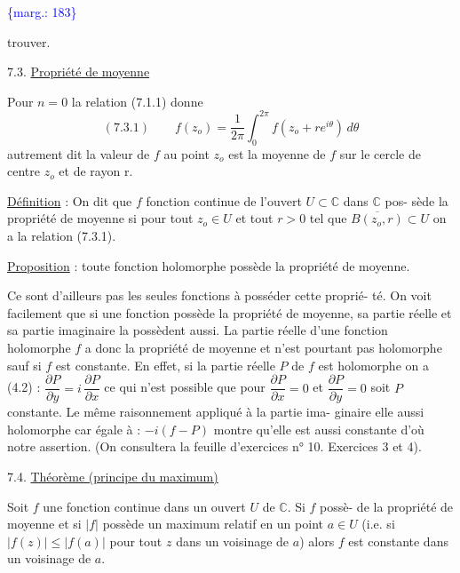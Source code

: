 \documentclass[11pt]{article}
\newcommand{\scanpage}[1]{\par\bigskip\noindent{\small\sffamily[scan #1]}\par}
\newcommand{\mspage}[1]{{\small\sffamily[p.\,#1]}}
\newcommand{\margin}[1]{\textcolor{blue}{\{\textsf{marg.:} #1\}}}
\newcommand{\uline}[1]{\underline{#1}}
\begin{document}
\margin{183}

\clearpage
\scanpage{119/184}
\mspage{- 3 -}

trouver.

7.3. \uline{Propriété de moyenne}

Pour $n = 0$ la relation (7.1.1) donne
\[ (7.3.1) \qquad f(z_o) = \frac{1}{2\pi}\int_0^{2\pi} f(z_o + re^{i\theta})\, d\theta \]
autrement dit la valeur de $f$ au point $z_o$ est la moyenne de $f$ sur le cercle
de centre $z_o$ et de rayon r.

\uline{Définition} : On dit que $f$ fonction continue de l'ouvert $U \subset \mathbb{C}$ dans $\mathbb{C}$ pos-%
sède la propriété de moyenne si pour tout $z_o \in U$ et tout $r > 0$ tel que
$\overline{B(z_o,r)} \subset U$ on a la relation (7.3.1).

\uline{Proposition} : toute fonction holomorphe possède la propriété de moyenne.

Ce sont d'ailleurs pas les seules fonctions à posséder cette proprié-%
té. On voit facilement que si une fonction possède la propriété de moyenne, sa
partie réelle et sa partie imaginaire la possèdent aussi. La partie réelle d'une
fonction holomorphe $f$ a donc la propriété de moyenne et n'est pourtant pas
holomorphe sauf si $f$ est constante. En effet, si la partie réelle $P$ de $f$
est holomorphe on a (4.2) : $\dfrac{\partial P}{\partial y} = i\,\dfrac{\partial P}{\partial x}$ ce qui n'est possible que pour $\dfrac{\partial P}{\partial x} = 0$
et $\dfrac{\partial P}{\partial y} = 0$ soit $P$ constante. Le même raisonnement appliqué à la partie ima-%
ginaire elle aussi holomorphe car égale à : $-i(f-P)$ montre qu'elle est aussi
constante d'où notre assertion.
(On consultera la feuille d'exercices n° 10. Exercices 3 et 4).

7.4. \uline{Théorème (principe du maximum)}

Soit $f$ une fonction continue dans un ouvert $U$ de $\mathbb{C}$. Si $f$ possè-%
de la propriété de moyenne et si $|f|$ possède un maximum relatif en un point
$a \in U$ (i.e. si $|f(z)| \leq |f(a)|$ pour tout $z$ dans un voisinage de $a$) alors
$f$ est constante dans un voisinage de $a$.
\end{document}
